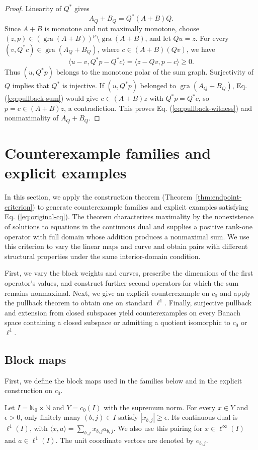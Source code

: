 \documentclass[11pt]{article}
\newcommand{\N}{\mathbb N}
\newcommand{\Nzero}{\mathbb N_0}
\newcommand{\gra}{\operatorname{gra}}
\newcommand{\pair}[2]{\langle #1,#2\rangle}
\theoremstyle{definition}
\theoremstyle{remark}
\begin{document}
\begin{proof}
Linearity of $Q^*$ gives
\begin{equation}
A_Q+B_Q=Q^*(A+B)Q.
\label{eq:pullback-sum}
\end{equation}
Since $A+B$ is monotone and not maximally monotone, choose $(z,p)\in(\gra(A+B))^\mu\setminus\gra(A+B)$, and let $Qu=z$. For every $(v,Q^*c)\in\gra(A_Q+B_Q)$, where $c\in(A+B)(Qv)$, we have
\[
\pair{u-v}{Q^*p-Q^*c}
=\pair{z-Qv}{p-c}\ge0.
\]
Thus $(u,Q^*p)$ belongs to the monotone polar of the sum graph. Surjectivity of $Q$ implies that $Q^*$ is injective. If $(u,Q^*p)$ belonged to $\gra(A_Q+B_Q)$, Eq. (\ref{eq:pullback-sum}) would give $c\in(A+B)z$ with $Q^*p=Q^*c$, so $p=c\in(A+B)z$, a contradiction. This proves Eq. (\ref{eq:pullback-witness}) and nonmaximality of $A_Q+B_Q$.
\end{proof}

\section{Counterexample families and explicit examples}
\label{sec:counterexamples}
In this section, we apply the construction theorem (Theorem~\ref{thm:endpoint-criterion}) to generate counterexample families and explicit examples satisfying Eq. (\ref{eq:original-cq}). The theorem characterizes maximality by the nonexistence of solutions to equations in the continuous dual and supplies a positive rank-one operator with full domain whose addition produces a nonmaximal sum. We use this criterion to vary the linear maps and curve and obtain pairs with different structural properties under the same interior-domain condition.

First, we vary the block weights and curves, prescribe the dimensions of the first operator's values, and construct further second operators for which the sum remains nonmaximal. Next, we give an explicit counterexample on $c_0$ and apply the pullback theorem to obtain one on standard $\ell^1$. Finally, surjective pullback and extension from closed subspaces yield counterexamples on every Banach space containing a closed subspace or admitting a quotient isomorphic to $c_0$ or $\ell^1$. 

\subsection{Block maps}
\label{subsec:common-block-maps}
First, we define the block maps used in the families below and in the explicit construction on $c_0$.

Let $I=\Nzero\times\N$ and $Y=c_0(I)$ with the supremum norm. For every $x\in Y$ and $\epsilon>0$, only finitely many $(b,j)\in I$ satisfy $|x_{b,j}|\ge\epsilon$. Its continuous dual is $\ell^1(I)$, with $\pair{x}{a}=\sum_{b,j}x_{b,j}a_{b,j}$. We also use this pairing for $x\in\ell^\infty(I)$ and $a\in\ell^1(I)$. The unit coordinate vectors are denoted by $e_{b,j}$.
\end{document}
